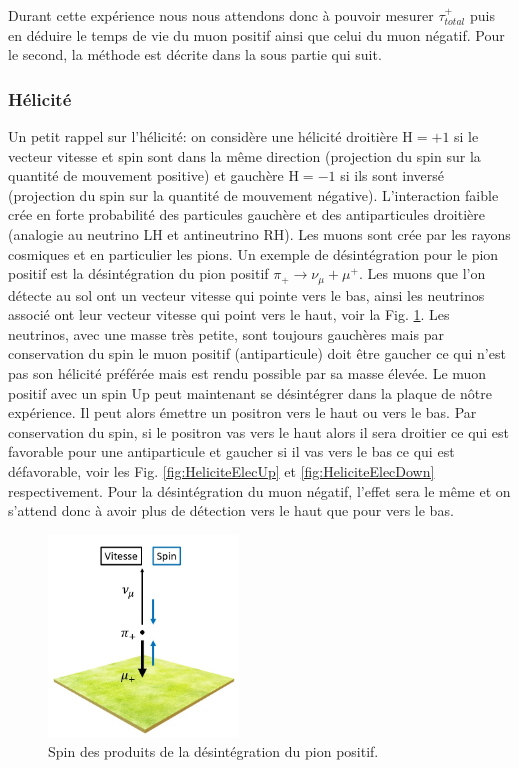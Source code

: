 \documentclass[12pt]{article}
\begin{document}
Durant cette expérience nous nous attendons donc à pouvoir mesurer $\tau_{total}^{+}$  puis en déduire le temps de vie du muon positif ainsi que celui du muon négatif. Pour le second, la méthode est décrite dans la sous partie qui suit.

\newpage

\subsubsection{Hélicité}

Un petit rappel sur l'hélicité: on considère une hélicité droitière H$=+1$ si le vecteur vitesse et spin sont dans la même direction (projection du spin sur la quantité de mouvement positive) et gauchère H$=-1$ si ils sont inversé (projection du spin sur la quantité de mouvement négative). L'interaction faible crée en forte probabilité des particules gauchère et des antiparticules droitière (analogie au neutrino LH et antineutrino RH). Les muons sont crée par les rayons cosmiques et en particulier les pions. Un exemple de désintégration pour le pion positif est la désintégration du pion positif $\pi_{+}\rightarrow\nu_{\mu}+\mu^{+}$. Les muons que l'on détecte au sol ont un vecteur vitesse qui pointe vers le bas, ainsi les neutrinos associé ont leur vecteur vitesse qui point vers le haut, voir la Fig. \ref{fig:Helicite}. Les neutrinos, avec une masse très petite, sont toujours gauchères mais par conservation du spin le muon positif (antiparticule) doit être gaucher ce qui n'est pas son hélicité préférée mais est rendu possible par sa masse élevée. Le muon positif avec un spin Up peut maintenant se désintégrer dans la plaque de nôtre expérience. Il peut alors émettre un positron vers le haut ou vers le bas. Par conservation du spin, si le positron vas vers le haut alors il sera droitier ce qui est favorable pour une antiparticule et gaucher si il vas vers le bas ce qui est défavorable, voir les Fig. \ref{fig:HeliciteElecUp} et \ref{fig:HeliciteElecDown} respectivement. Pour la désintégration du muon négatif, l'effet sera le même et on s'attend donc à avoir plus de détection vers le haut que pour vers le bas.

\begin{figure}[htpb!]
    \centering
    \includegraphics[width=0.45\textwidth]{Images/Photos/Helicite.jpg}
    \caption{Spin des produits de la désintégration du pion positif.}
    \label{fig:Helicite}
\end{figure}
\end{document}
